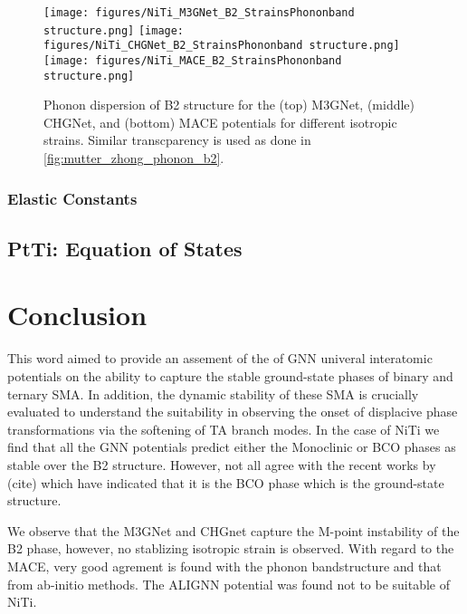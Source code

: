 \documentclass[preprint,colorlinks=true,linkcolor=black,citecolor=black]{elsarticle}
\begin{document}
\begin{figure}[!htp]
	\begin{centering}
		\texttt{[image: figures/NiTi\_M3GNet\_B2\_StrainsPhononband
			structure.png]} \vspace{1mm}
		\texttt{[image: figures/NiTi\_CHGNet\_B2\_StrainsPhononband
			structure.png]} \vspace{1mm}
		\texttt{[image: figures/NiTi\_MACE\_B2\_StrainsPhononband
			structure.png]}
		\caption{ Phonon dispersion of B2 structure for the (top) M3GNet,
			(middle) CHGNet, and (bottom) MACE potentials for different
			isotropic strains. Similar transcparency is used as done in
			\ref{fig:mutter_zhong_phonon_b2}.  }
		\label{fig:gnn_phonon_b2}
	\end{centering}
\end{figure}


\subsubsection{Elastic Constants}


\subsection{PtTi: Equation of States}
\label{sec:ptti_eos}

\section{Conclusion}
\label{sec:conclusion}
This word aimed to provide an assement of the of GNN univeral
interatomic potentials on the ability to capture the stable
ground-state phases of binary and ternary SMA. In addition, the
dynamic stability of these SMA is crucially evaluated to understand
the suitability in observing the onset of displacive phase
transformations via the softening of TA branch modes. In the case of
NiTi we find that all the GNN potentials predict either the Monoclinic
or BCO phases as stable over the B2 structure. However, not all agree
with the recent works by (cite) which have indicated that it is the
BCO phase which is the ground-state structure.

We observe that the M3GNet and CHGnet capture the M-point instability
of the B2 phase, however, no stablizing isotropic strain is
observed. With regard to the MACE, very good agrement is found with
the phonon bandstructure and that from ab-initio methods. The ALIGNN
potential was found not to be suitable of NiTi.
\end{document}
